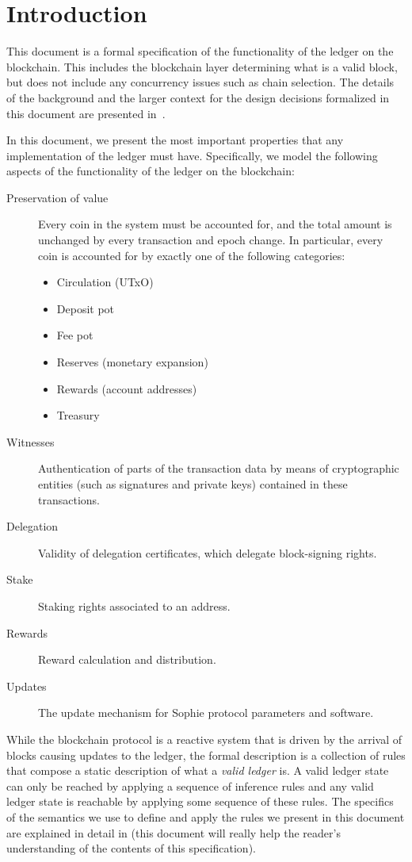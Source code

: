 \section{Introduction}
\label{sec:introduction-sophie}

This document is a formal specification of the functionality of the ledger on the blockchain.
This includes the blockchain layer determining what is a valid block,
but does not include any concurrency issues such as chain selection.
The details of the background and the larger context
for the design decisions formalized in this document are presented
in~\cite{delegation_design}.

In this document,
we present the most important properties that any implementation of the ledger must have.
Specifically, we model the following aspects
of the functionality of the ledger on the blockchain:

\begin{description}
\item[Preservation of value] Every coin in the system must be accounted for,
  and the total amount is unchanged by every transaction and epoch change.
  In particular, every coin is accounted for by exactly one of the following categories:
  \begin{itemize}
    \item Circulation (UTxO)
    \item Deposit pot
    \item Fee pot
    \item Reserves (monetary expansion)
    \item Rewards (account addresses)
    \item Treasury
  \end{itemize}
\item[Witnesses] Authentication of parts of the transaction data by means of
  cryptographic entities (such as signatures and private keys) contained in
  these transactions.
\item[Delegation] Validity of delegation certificates, which delegate
  block-signing rights.
\item[Stake] Staking rights associated to an address.
\item[Rewards] Reward calculation and distribution.
\item[Updates] The update mechanism for Sophie protocol parameters and software.
\end{description}

While the blockchain protocol is a reactive system that is driven by the arrival
of blocks causing updates to the ledger, the formal description is a collection
of rules that compose a
static description of what a \textit{valid ledger} is. A valid ledger state can only
be reached by applying a sequence of inference rules and any valid ledger state
is reachable by applying some sequence of these rules.
The specifics of the semantics we use to define and apply
the rules we present in this document are explained in detail in
\cite{small_step_semantics} (this document will really help the reader's
understanding of the contents of this specification).

